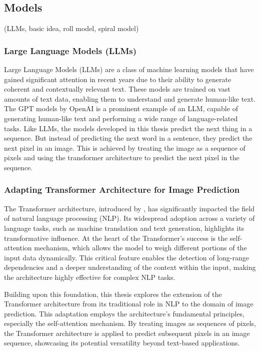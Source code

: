 \subsection{Models}
    (LLMs, basic idea, roll model, spiral model)

    \subsubsection{Large Language Models (LLMs)}

    Large Language Models (LLMs) are a class of machine learning models that have gained significant attention in recent years due to their ability to generate coherent and contextually relevant text. These models are trained on vast amounts of text data, enabling them to understand and generate human-like text. The GPT models by OpenAI \autocite{GPT2radford2019} is a prominent example of an LLM, capable of generating human-like text and performing a wide range of language-related tasks. Like LLMs, the models developed in this thesis predict the next thing in a sequence. But instead of predicting the next word in a sentence, they predict the next pixel in an image. This is achieved by treating the image as a sequence of pixels and using the transformer architecture to predict the next pixel in the sequence.

    \subsubsection{Adapting Transformer Architecture for Image Prediction}

    The Transformer architecture, introduced by \autocite{vaswani2023attention}, has significantly impacted the field of natural language processing (NLP). Its widespread adoption across a variety of language tasks, such as machine translation and text generation, highlights its transformative influence. At the heart of the Transformer's success is the self-attention mechanism, which allows the model to weigh different portions of the input data dynamically. This critical feature enables the detection of long-range dependencies and a deeper understanding of the context within the input, making the architecture highly effective for complex NLP tasks.

    Building upon this foundation, this thesis explores the extension of the Transformer architecture from its traditional role in NLP to the domain of image prediction. This adaptation employs the architecture's fundamental principles, especially the self-attention mechanism. By treating images as sequences of pixels, the Transformer architecture is applied to predict subsequent pixels in an image sequence, showcasing its potential versatility beyond text-based applications.
    

